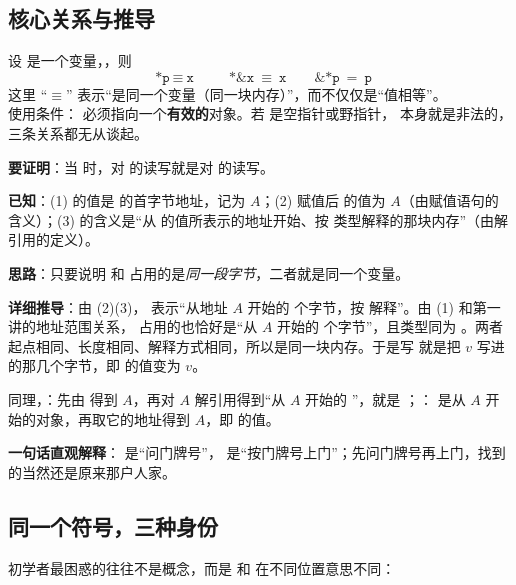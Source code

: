 \subsection{核心关系与推导}
\begin{formulabox}
设  是一个变量，，则
\[
\boxed{\ \texttt{*p}\ \equiv\ \texttt{x}\ }\qquad
\texttt{*\&x}\ \equiv\ \texttt{x}\qquad
\texttt{\&*p}\ =\ \texttt{p}
\]
这里 “$\equiv$” 表示“是同一个变量（同一块内存）”，而不仅仅是“值相等”。\\
{\small 使用条件： 必须指向一个\textbf{有效的}对象。若  是空指针或野指针， 本身就是非法的，三条关系都无从谈起。}
\end{formulabox}

\begin{proofbox}
\textbf{要证明}：当  时，对  的读写就是对  的读写。

\textbf{已知}：(1)  的值是  的首字节地址，记为 $A$；(2) 赋值后  的值为 $A$（由赋值语句的含义）；(3)  的含义是“从  的值所表示的地址开始、按  类型解释的那块内存”（由解引用的定义）。

\textbf{思路}：只要说明  和  占用的是\emph{同一段字节}，二者就是同一个变量。

\textbf{详细推导}：由 (2)(3)， 表示“从地址 $A$ 开始的  个字节，按  解释”。由 (1) 和第一讲的地址范围关系， 占用的也恰好是“从 $A$ 开始的  个字节”，且类型同为 。两者起点相同、长度相同、解释方式相同，所以是同一块内存。于是写  就是把 $v$ 写进  的那几个字节，即  的值变为 $v$。

同理，：先由  得到 $A$，再对 $A$ 解引用得到“从 $A$ 开始的 ”，就是 ；： 是从 $A$ 开始的对象，再取它的地址得到 $A$，即  的值。

\textbf{一句话直观解释}：\cc{\&} 是“问门牌号”，\cc{*} 是“按门牌号上门”；先问门牌号再上门，找到的当然还是原来那户人家。
\end{proofbox}

\subsection{同一个符号，三种身份}
初学者最困惑的往往不是概念，而是 \cc{*} 和 \cc{\&} 在不同位置意思不同：

